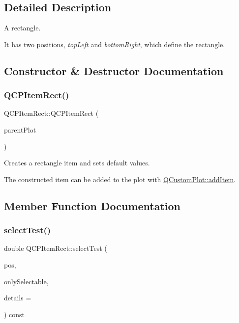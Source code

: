 \subsection{Detailed Description}
A rectangle. 

 It has two positions, {\itshape top\+Left} and {\itshape bottom\+Right}, which define the rectangle. 

\subsection{Constructor \& Destructor Documentation}
\hypertarget{class_q_c_p_item_rect_a412ad1579f7a1fba453d0fa28c496cbc}{}\label{class_q_c_p_item_rect_a412ad1579f7a1fba453d0fa28c496cbc} 
\subsubsection{\texorpdfstring{Q\+C\+P\+Item\+Rect()}{QCPItemRect()}}
{\footnotesize\ttfamily Q\+C\+P\+Item\+Rect\+::\+Q\+C\+P\+Item\+Rect (\begin{DoxyParamCaption}\item[{\hyperlink{class_q_custom_plot}{Q\+Custom\+Plot} $\ast$}]{parent\+Plot }\end{DoxyParamCaption})}

Creates a rectangle item and sets default values.

The constructed item can be added to the plot with \hyperlink{class_q_custom_plot_aa500620379262321685cb7a7674cbd2a}{Q\+Custom\+Plot\+::add\+Item}. 

\subsection{Member Function Documentation}
\hypertarget{class_q_c_p_item_rect_abe1a6091591d3bad5e4efab2331f99ec}{}\label{class_q_c_p_item_rect_abe1a6091591d3bad5e4efab2331f99ec} 
\subsubsection{\texorpdfstring{select\+Test()}{selectTest()}}
{\footnotesize\ttfamily double Q\+C\+P\+Item\+Rect\+::select\+Test (\begin{DoxyParamCaption}\item[{const Q\+PointF \&}]{pos,  }\item[{bool}]{only\+Selectable,  }\item[{Q\+Variant $\ast$}]{details = {} }\end{DoxyParamCaption}) const\hspace{0.3cm}{\ttfamily [virtual]}}

